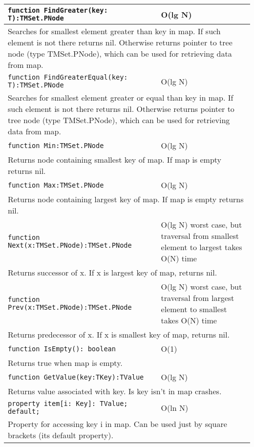 \begin{longtable}{|m{10cm}|m{5cm}|}
\verb!function FindGreater(key: T):TMSet.PNode! & O(lg N) \\\hline
\multicolumn{2}{|m{15cm}|}{Searches for smallest element greater than key in map. If such element is not there returns nil. Otherwise
returns pointer to tree node (type TMSet.PNode), which can be used for retrieving data from map.} \\\hline\hline

\verb!function FindGreaterEqual(key: T):TMSet.PNode! & O(lg N) \\\hline
\multicolumn{2}{|m{15cm}|}{Searches for smallest element greater or equal than key in map. If such element is not there returns nil. Otherwise
returns pointer to tree node (type TMSet.PNode), which can be used for retrieving data from map.} \\\hline\hline

\verb!function Min:TMSet.PNode! & O(lg N) \\\hline
\multicolumn{2}{|m{15cm}|}{Returns node containing smallest key of map. If map is empty returns
nil.} \\\hline\hline

\verb!function Max:TMSet.PNode! & O(lg N) \\\hline
\multicolumn{2}{|m{15cm}|}{Returns node containing largest key of map. If map is empty returns
nil.} \\\hline\hline

\verb!function Next(x:TMSet.PNode):TMSet.PNode! & O(lg N) worst case, but traversal from smallest element to
largest takes O(N) time \\\hline
\multicolumn{2}{|m{15cm}|}{Returns successor of x. If x is largest key of map, returns nil.} \\\hline\hline

\verb!function Prev(x:TMSet.PNode):TMSet.PNode! & O(lg N) worst case, but traversal from largest element to
smallest takes O(N) time \\\hline
\multicolumn{2}{|m{15cm}|}{Returns predecessor of x. If x is smallest key of map, returns nil.} \\\hline\hline

\verb!function IsEmpty(): boolean! & O(1) \\ \hline
\multicolumn{2}{|m{15cm}|}{Returns true when map is empty.} \\\hline

\verb!function GetValue(key:TKey):TValue! & O(lg N) \\\hline
\multicolumn{2}{|m{15cm}|}{Returns value associated with key. Is key isn't in map crashes.} \\\hline

\verb!property item[i: Key]: TValue; default;! & O(ln N) \\\hline
\multicolumn{2}{|m{15cm}|}{Property for accessing key i in map. Can be used just by square
brackets (its default property).} \\\hline\hline


\end{longtable}
